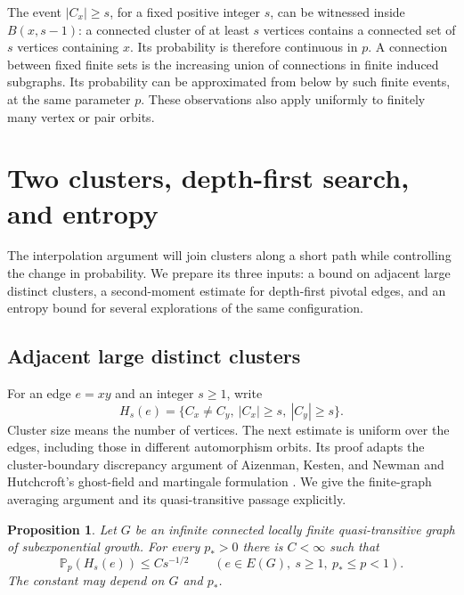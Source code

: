 \documentclass[11pt]{article}
\newtheorem{proposition}[theorem]{Proposition}
\theoremstyle{definition}
\begin{document}
The event $|C_x|\ge s$, for a fixed positive integer $s$, can be
witnessed inside $B(x,s-1)$: a connected cluster of at least $s$
vertices contains a connected set of $s$ vertices containing $x$.
Its probability is therefore continuous in $p$. A connection between
fixed finite sets is the increasing union of connections in finite
induced subgraphs. Its probability can be approximated from below
by such finite events, at the same parameter $p$. These observations
also apply uniformly to finitely many vertex or pair orbits.

\section{Two clusters, depth-first search, and entropy}
\label{sec:dfs-entropy}

The interpolation argument will join clusters along a short path while
controlling the change in probability. We prepare its three inputs: a
bound on adjacent large distinct clusters, a second-moment estimate for
depth-first pivotal edges, and an entropy bound for several explorations
of the same configuration.

\subsection{Adjacent large distinct clusters}

For an edge $e=xy$ and an integer $s\ge1$, write
\[
 H_s(e)=\{C_x\ne C_y,\ |C_x|\ge s,\ |C_y|\ge s\}.
\]
Cluster size means the number of vertices. The next estimate is uniform
over the edges, including those in different automorphism orbits.
Its proof adapts the cluster-boundary discrepancy argument of
Aizenman, Kesten, and Newman \cite[Section~3]{AizenmanKestenNewman1987}
and Hutchcroft's ghost-field and martingale formulation
\cite[Section~3]{Hutchcroft2020Locality}.
We give the finite-graph averaging argument and its quasi-transitive
passage explicitly.

\begin{proposition}\label{prop:two-cluster}
Let $G$ be an infinite connected locally finite quasi-transitive graph
of subexponential growth. For every $p_*>0$ there is $C<\infty$ such
that
\[
 \mathbb P_p(H_s(e))\le C s^{-1/2}
 \qquad(e\in E(G),\ s\ge1,\ p_*\le p<1).
\]
The constant may depend on $G$ and $p_*$.
\end{proposition}
\end{document}
